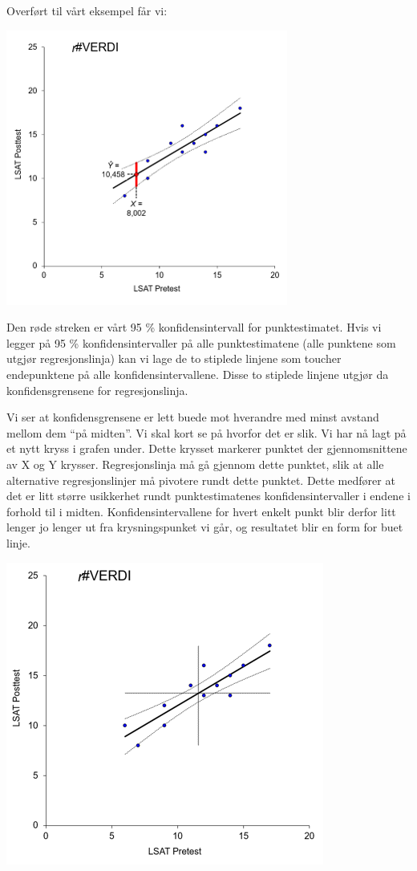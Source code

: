 \documentclass[
]{article}
\begin{document}
Overført til vårt eksempel får vi:

\includegraphics{Teori_fig9.png}

Den røde streken er vårt 95 \% konfidensintervall for punktestimatet. Hvis vi legger på 95 \% konfidensintervaller på alle punktestimatene (alle punktene som utgjør regresjonslinja) kan vi lage de to stiplede linjene som toucher endepunktene på alle konfidensintervallene. Disse to stiplede linjene utgjør da konfidensgrensene for regresjonslinja.

Vi ser at konfidensgrensene er lett buede mot hverandre med minst avstand mellom dem ``på midten''. Vi skal kort se på hvorfor det er slik. Vi har nå lagt på et nytt kryss i grafen under. Dette krysset markerer punktet der gjennomsnittene av X og Y krysser. Regresjonslinja må gå gjennom dette punktet, slik at alle alternative regresjonslinjer må pivotere rundt dette punktet. Dette medfører at det er litt større usikkerhet rundt punktestimatenes konfidensintervaller i endene i forhold til i midten. Konfidensintervallene for hvert enkelt punkt blir derfor litt lenger jo lenger ut fra krysningspunket vi går, og resultatet blir en form for buet linje.

\includegraphics{Teori_fig10.png}
\end{document}
